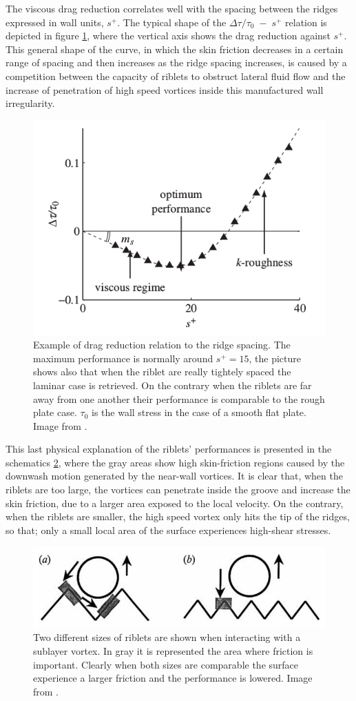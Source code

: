 The viscous drag reduction correlates well with the spacing between the ridges expressed in wall units, $ s^+ $. The typical shape of the $\Delta \tau/\tau_0 \; - \; s^+$ relation is depicted in figure \ref{fig:riblets_perf}, where the vertical axis shows the drag reduction against $s^+$.
This general shape of the curve, in which the skin friction decreases in a certain range of spacing and then increases as the ridge spacing  increases, is caused by a competition between the capacity of riblets to obstruct lateral fluid flow and the increase of penetration of high speed vortices inside this manufactured wall irregularity.

\begin{figure}[h]
	\centering
	\includegraphics[width=0.5\linewidth]{chapter_1/riblets_performance}
	\caption{Example of drag reduction relation to the ridge spacing. The maximum performance is normally around $ s^+ = 15 $, the picture shows also that when the riblet are really tightely spaced the laminar case is retrieved. On the contrary when the riblets are far away from one another their performance is comparable to the  rough plate case. $\tau_{0}$ is the wall stress in the case of a smooth flat plate. Image from \citet{jimenez2001turbulent}. }
	\label{fig:riblets_perf}
\end{figure}

This last physical explanation of the riblets' performances is presented in the schematics \ref{fig:riblets_schem}, where the gray areas show high skin-friction regions caused by the downwash motion generated by the near-wall vortices.
It is clear that, when the riblets are too large, the vortices can penetrate inside the groove and increase the skin friction, due to a larger area exposed to the local velocity.
On the contrary, when the riblets are smaller, the high speed vortex only hits the tip of the ridges, so that; only a small local area of the surface experiences high-shear stresses.

\begin{figure}[h]
	\centering
	\includegraphics[width=0.7\linewidth]{chapter_1/riblets1}
	\caption{Two different sizes of riblets are shown when interacting with a sublayer vortex. In gray it is represented the area where friction is important. Clearly when both sizes are comparable the surface experience a larger friction and the performance is lowered. Image from \citet{choi1993direct}.}
	\label{fig:riblets_schem}
\end{figure}

